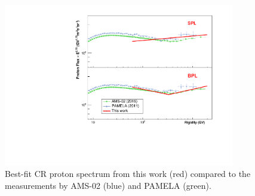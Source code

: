 \begin{figure}
    \centering
    \includegraphics[width=0.9\textwidth]{img/ProtonSpectrumModelMeasurement.pdf}
    \caption{Best-fit CR proton spectrum from this work (red) compared to the measurements by AMS-02 (blue) and PAMELA (green).}
    \label{fig:proton-flux}
\end{figure}



